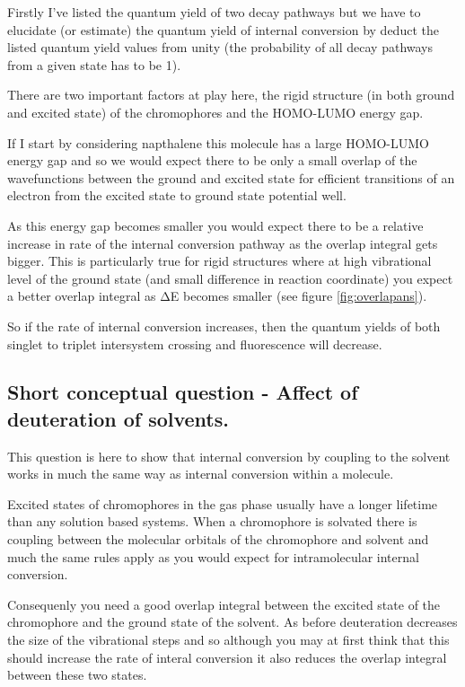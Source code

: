 \documentclass[
]{book}
\begin{document}
Firstly I've listed the quantum yield of two decay pathways but we have to elucidate (or estimate) the quantum yield of internal conversion by deduct the listed quantum yield values from unity (the probability of all decay pathways from a given state has to be 1).

There are two important factors at play here, the rigid structure (in both ground and excited state) of the chromophores and the HOMO-LUMO energy gap.

If I start by considering napthalene this molecule has a large HOMO-LUMO energy gap and so we would expect there to be only a small overlap of the wavefunctions between the ground and excited state for efficient transitions of an electron from the excited state to ground state potential well.

As this energy gap becomes smaller you would expect there to be a relative increase in rate of the internal conversion pathway as the overlap integral gets bigger. This is particularly true for rigid structures where at high vibrational level of the ground state (and small difference in reaction coordinate) you expect a better overlap integral as ΔE becomes smaller (see figure \ref{fig:overlapans}).

So if the rate of internal conversion increases, then the quantum yields of both singlet to triplet intersystem crossing and fluorescence will decrease.

\hypertarget{sec:dsolventans}{%
\subsection{Short conceptual question - Affect of deuteration of solvents.}\label{sec:dsolventans}}

This question is here to show that internal conversion by coupling to the solvent works in much the same way as internal conversion within a molecule.

Excited states of chromophores in the gas phase usually have a longer lifetime than any solution based systems. When a chromophore is solvated there is coupling between the molecular orbitals of the chromophore and solvent and much the same rules apply as you would expect for intramolecular internal conversion.

Consequenly you need a good overlap integral between the excited state of the chromophore and the ground state of the solvent. As before deuteration decreases the size of the vibrational steps and so although you may at first think that this should increase the rate of interal conversion it also reduces the overlap integral between these two states.
\end{document}
